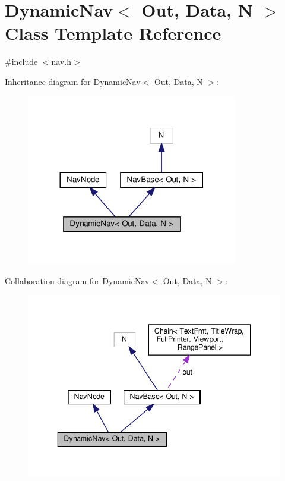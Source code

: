 \hypertarget{classDynamicNav}{}\section{Dynamic\+Nav$<$ Out, Data, N $>$ Class Template Reference}
\label{classDynamicNav}


{\ttfamily \#include $<$nav.\+h$>$}



Inheritance diagram for Dynamic\+Nav$<$ Out, Data, N $>$\+:\nopagebreak
\begin{figure}[H]
\begin{center}
\leavevmode
\includegraphics[width=260pt]{classDynamicNav__inherit__graph}
\end{center}
\end{figure}


Collaboration diagram for Dynamic\+Nav$<$ Out, Data, N $>$\+:\nopagebreak
\begin{figure}[H]
\begin{center}
\leavevmode
\includegraphics[width=343pt]{classDynamicNav__coll__graph}
\end{center}
\end{figure}
